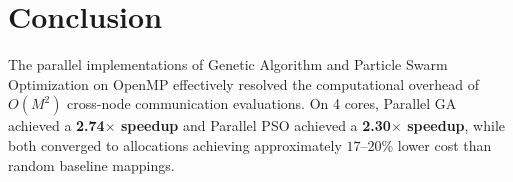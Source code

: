 \documentclass[12pt]{article}
\begin{document}
\section{Conclusion}
The parallel implementations of Genetic Algorithm and Particle Swarm Optimization on OpenMP effectively resolved the computational overhead of $O(M^2)$ cross-node communication evaluations. On 4 cores, Parallel GA achieved a \textbf{2.74$\times$ speedup} and Parallel PSO achieved a \textbf{2.30$\times$ speedup}, while both converged to allocations achieving approximately $17\text{--}20\%$ lower cost than random baseline mappings.
\end{document}
